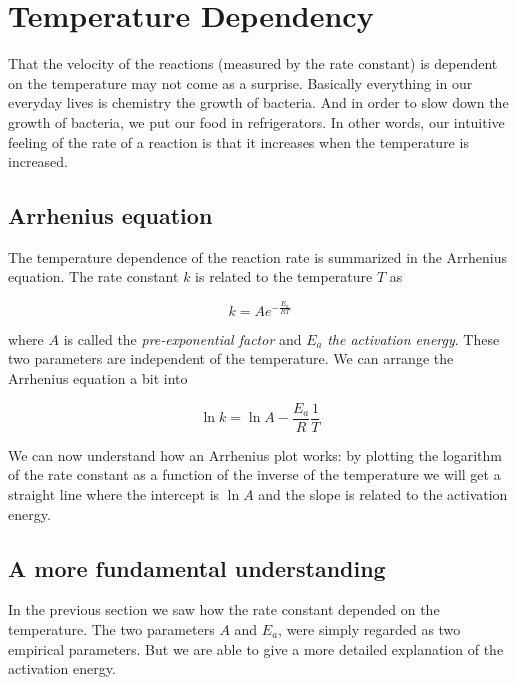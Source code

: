 \chapter{Temperature Dependency}
\label{chap:Temperature}

That the velocity of the reactions (measured by the rate constant) is dependent on the temperature may not come as a surprise. Basically everything in our everyday lives is chemistry \eg the growth of bacteria. And in order to slow down the growth of bacteria, we put our food in refrigerators. In other words, our intuitive feeling of the rate of a reaction is that it increases when the temperature is increased.

\section{Arrhenius equation}
\label{sect:Arrhenius}

The temperature dependence of the reaction rate is summarized in the Arrhenius equation. The rate constant $k$ is related to the temperature $T$ as

\begin{equation}
    \label{eq:Arrhenius}
    k = Ae^{-\frac{E_a}{RT}}
\end{equation}

where $A$ is called the \textit{pre-exponential factor} and $E_a$ \textit{the activation energy}. These two parameters are independent of the temperature. We can arrange the Arrhenius equation a bit into

\begin{equation}
    \ln k = \ln A - \frac{E_a}{R} \frac{1}{T}
\end{equation}

We can now understand how an Arrhenius plot works: by plotting the logarithm of the rate constant as a function of the inverse of the temperature we will get a straight line where the intercept is $\ln A$ and the slope is related to the activation energy.

\section{A more fundamental understanding}
\label{sect:ArrheniusExplained}

In the previous section we saw how the rate constant depended on the temperature. The two parameters $A$ and $E_a$, were simply regarded as two empirical parameters. But we are able to give a more detailed explanation of the activation energy.

